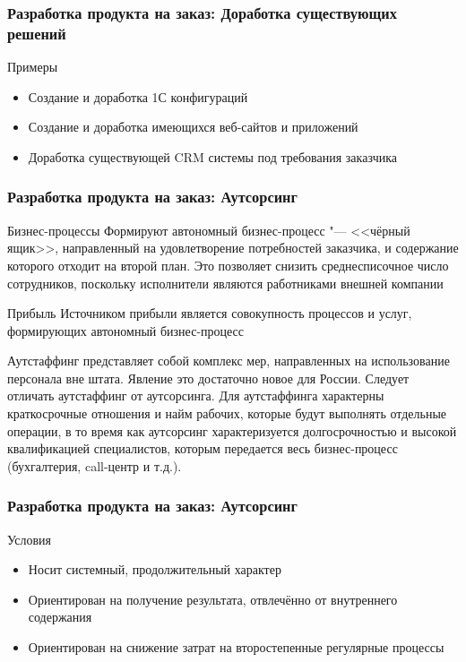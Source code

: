 \documentclass{../industrial-development}
\begin{document}
\begin{frame} \frametitle{Разработка продукта на заказ: Доработка существующих решений}
	\begin{block}{Примеры}
		\begin{itemize}
			\item Создание и доработка 1С конфигураций
			\item Создание и доработка имеющихся веб-сайтов и приложений
			\item Доработка существующей CRM системы под требования заказчика
		\end{itemize}
	\end{block}
\end{frame}
\lecturenotes


\begin{frame} \frametitle{Разработка продукта на заказ: Аутсорсинг}
	\begin{block}{Бизнес-процессы}
		Формируют автономный бизнес-процесс "--- <<чёрный ящик>>, направленный на удовлетворение потребностей заказчика, и содержание которого отходит на второй план.
		Это позволяет снизить среднесписочное число сотрудников, поскольку исполнители являются работниками внешней компании
	\end{block}
	\begin{block}{Прибыль}
		Источником прибыли является совокупность процессов и услуг, формирующих автономный бизнес-процесс
	\end{block}
\end{frame}
\lecturenotes
Аутстаффинг представляет собой комплекс мер, направленных на использование персонала вне штата. Явление это достаточно новое для России. Следует отличать аутстаффинг от аутсорсинга. Для аутстаффинга характерны краткосрочные отношения и найм рабочих, которые будут выполнять отдельные операции, в то время как аутсорсинг характеризуется долгосрочностью и высокой квалификацией специалистов, которым передается весь бизнес-процесс (бухгалтерия, call-центр и т.д.).



\begin{frame} \frametitle{Разработка продукта на заказ: Аутсорсинг}
	\begin{block}{Условия}
		\begin{itemize}
			\item Носит системный, продолжительный характер
			\item Ориентирован на получение результата, отвлечённо от внутреннего содержания
			\item Ориентирован на снижение затрат на второстепенные регулярные процессы
		\end{itemize}
	\end{block}
\end{frame}
\lecturenotes
\end{document}
